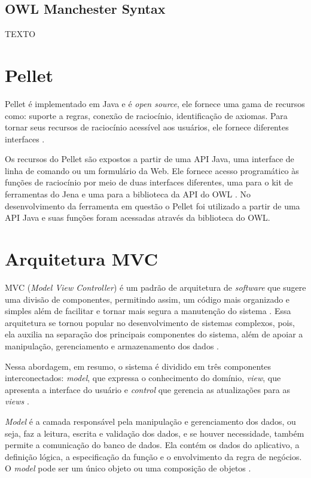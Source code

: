 \documentclass{bcc}
\begin{document}
\subsection{OWL Manchester Syntax}

TEXTO

\section{Pellet}

Pellet é implementado em Java e é \textit{open source}, ele fornece uma gama de recursos como: suporte a regras, conexão de raciocínio, identificação de axiomas. Para tornar seus recursos de raciocínio acessível aos usuários, ele fornece diferentes interfaces \cite{sirin2007}.

Os recursos do Pellet são expostos a partir de uma API Java, uma interface de linha de comando ou um formulário da Web. Ele fornece acesso programático às funções de raciocínio por meio de duas interfaces diferentes, uma para o kit de ferramentas do Jena e uma para a biblioteca da API do OWL \cite{parsia2004}. No desenvolvimento da ferramenta em questão o Pellet foi utilizado a partir de uma API Java e suas funções foram acessadas através da biblioteca do OWL.

\section{Arquitetura MVC}

MVC (\textit{Model View Controller}) é um padrão de arquitetura de \textit{software} que sugere uma divisão de componentes, permitindo assim, um código mais organizado e simples além de facilitar e tornar mais segura a manutenção do sistema \cite{da2012}. Essa arquitetura se tornou popular no desenvolvimento de sistemas complexos, pois, ela auxilia na separação dos principais componentes do sistema, além de apoiar a manipulação, gerenciamento e armazenamento dos dados \cite{de2013}.

Nessa abordagem, em resumo, o sistema é dividido em três componentes interconectados: \textit{model}, que expressa o conhecimento do domínio, \textit{view}, que apresenta a interface do usuário e \textit{control} que gerencia as atualizações para as \textit{views} \cite{selfa2006}.
 
 \textit{Model} é a camada responsável pela manipulação e gerenciamento dos dados, ou seja, faz a leitura, escrita e validação dos dados, e se houver necessidade, também permite a comunicação do banco de dados. Ela contém os dados do aplicativo, a definição lógica, a especificação da função e o envolvimento da regra de negócios. O \textit{model} pode ser um único objeto ou uma composição de objetos \cite{jailia2016}.
 
\end{document}
